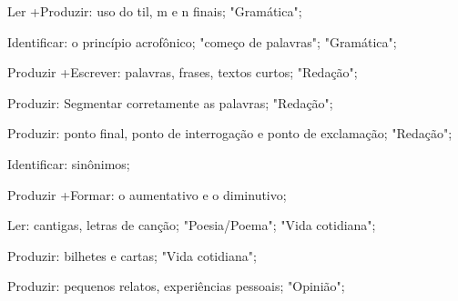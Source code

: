  Ler +Produzir: uso do til, m e n finais; "Gramática";

 Identificar: o princípio acrofônico; "começo de palavras"; "Gramática";

 Produzir +Escrever: palavras, frases, textos curtos; "Redação";

 Produzir: Segmentar corretamente as palavras; "Redação";

 Produzir: ponto final, ponto de interrogação e ponto de exclamação; "Redação";

 Identificar: sinônimos;

 Produzir +Formar: o aumentativo e o diminutivo;

 Ler: cantigas, letras de canção; "Poesia/Poema"; "Vida cotidiana";

 Produzir: bilhetes e cartas; "Vida cotidiana";

 Produzir: pequenos relatos, experiências pessoais; "Opinião";

